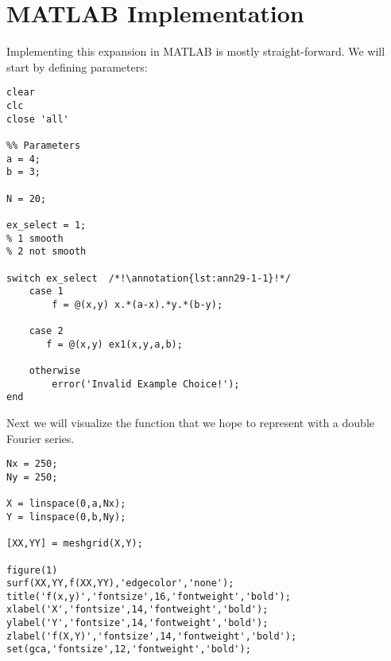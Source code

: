 \section{MATLAB Implementation}
Implementing this expansion in MATLAB is mostly straight-forward.  We will start by defining parameters:
\begin{lstlisting}[name=lec29-ex1, style=myMatlab]
clear
clc
close 'all'

%% Parameters
a = 4;
b = 3;

N = 20;

ex_select = 1;
% 1 smooth
% 2 not smooth

switch ex_select  /*!\annotation{lst:ann29-1-1}!*/
    case 1
        f = @(x,y) x.*(a-x).*y.*(b-y);
        
    case 2
       f = @(x,y) ex1(x,y,a,b);
       
    otherwise
        error('Invalid Example Choice!');
end
\end{lstlisting}

\noindent Next we will visualize the function that we hope to represent with a double Fourier series.

\begin{lstlisting}[name=lec29-ex1,style=myMatlab]
Nx = 250;
Ny = 250;

X = linspace(0,a,Nx);
Y = linspace(0,b,Ny);

[XX,YY] = meshgrid(X,Y);

figure(1)
surf(XX,YY,f(XX,YY),'edgecolor','none');
title('f(x,y)','fontsize',16,'fontweight','bold');
xlabel('X','fontsize',14,'fontweight','bold');
ylabel('Y','fontsize',14,'fontweight','bold');
zlabel('f(X,Y)','fontsize',14,'fontweight','bold');
set(gca,'fontsize',12,'fontweight','bold');


\end{lstlisting}


